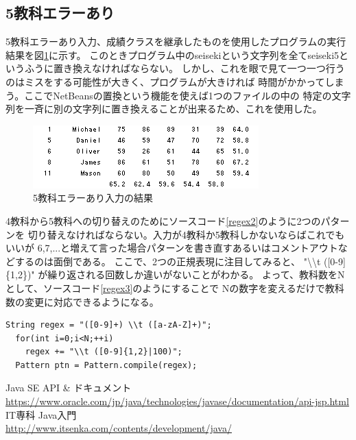 \documentclass[dvipdfmx]{jsarticle}
\begin{document}
\subsection{5教科エラーあり}
5教科エラーあり入力、成績クラスを継承したものを使用したプログラムの実行結果を図\ref{res3}に示す。
このときプログラム中のseisekiという文字列を全てseiseki5というふうに置き換えなければならない。
しかし、これを眼で見て一つ一つ行うのはミスをする可能性が大きく、プログラムが大きければ
時間がかかってしまう。ここでNetBeansの置換という機能を使えば1つのファイルの中の
特定の文字列を一斉に別の文字列に置き換えることが出来るため、これを使用した。
\begin{figure}[H]
  \centering
  \includegraphics[width=0.7\hsize]{../pic/res3.png}
  \caption{5教科エラーあり入力の結果}
  \label{res3}
\end{figure}

4教科から5教科への切り替えのためにソースコード\ref{regex2}のように2つのパターンを
切り替えなければならない。入力が4教科か5教科しかないならばこれでもいいが
6,7,...と増えて言った場合パターンを書き直すあるいはコメントアウトなどするのは面倒である。
ここで、2つの正規表現に注目してみると、
"\textbackslash\textbackslash t ([0-9]\{1,2\})"
が繰り返される回数しか違いがないことがわかる。
よって、教科数をNとして、ソースコード\ref{regex3}のようにすることで
Nの数字を変えるだけで教科数の変更に対応できるようになる。
\begin{lstlisting}[caption=N教科の正規表現,label=regex3]
  String regex = "([0-9]+) \\t ([a-zA-Z]+)";
  for(int i=0;i<N;++i)
    regex += "\\t ([0-9]{1,2}|100)";
  Pattern ptn = Pattern.compile(regex);
\end{lstlisting}


\begin{thebibliography}{10} 
   Java SE API \& ドキュメント \\
  \url{https://www.oracle.com/jp/java/technologies/javase/documentation/api-jsp.html}
   IT専科 Java入門 \\
  \url{http://www.itsenka.com/contents/development/java/}
\end{thebibliography}
\end{document}
